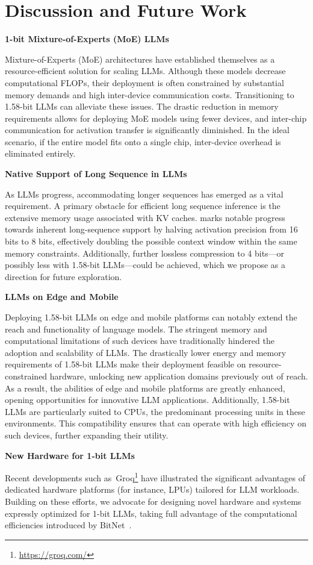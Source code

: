 \section{Discussion and Future Work}

\textbf{1-bit Mixture-of-Experts (MoE) LLMs}

Mixture-of-Experts (MoE) architectures have established themselves as a resource-efficient solution for scaling LLMs. Although these models decrease computational FLOPs, their deployment is often constrained by substantial memory demands and high inter-device communication costs. Transitioning to 1.58-bit LLMs can alleviate these issues. The drastic reduction in memory requirements allows for deploying MoE models using fewer devices, and inter-chip communication for activation transfer is significantly diminished. In the ideal scenario, if the entire model fits onto a single chip, inter-device overhead is eliminated entirely.

\textbf{Native Support of Long Sequence in LLMs}

As LLMs progress, accommodating longer sequences has emerged as a vital requirement. A primary obstacle for efficient long sequence inference is the extensive memory usage associated with KV caches.  marks notable progress towards inherent long-sequence support by halving activation precision from 16 bits to 8 bits, effectively doubling the possible context window within the same memory constraints. Additionally, further lossless compression to 4 bits—or possibly less with 1.58-bit LLMs—could be achieved, which we propose as a direction for future exploration.

\textbf{LLMs on Edge and Mobile}

Deploying 1.58-bit LLMs on edge and mobile platforms can notably extend the reach and functionality of language models. The stringent memory and computational limitations of such devices have traditionally hindered the adoption and scalability of LLMs. The drastically lower energy and memory requirements of 1.58-bit LLMs make their deployment feasible on resource-constrained hardware, unlocking new application domains previously out of reach. As a result, the abilities of edge and mobile platforms are greatly enhanced, opening opportunities for innovative LLM applications. Additionally, 1.58-bit LLMs are particularly suited to CPUs, the predominant processing units in these environments. This compatibility ensures that  can operate with high efficiency on such devices, further expanding their utility.

\textbf{New Hardware for 1-bit LLMs}

Recent developments such as~Groq\footnote{\url{https://groq.com/}} have illustrated the significant advantages of dedicated hardware platforms (for instance, LPUs) tailored for LLM workloads. Building on these efforts, we advocate for designing novel hardware and systems expressly optimized for 1-bit LLMs, taking full advantage of the computational efficiencies introduced by BitNet~\cite{bitnet}.